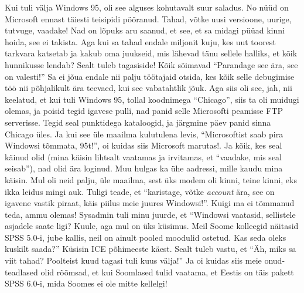 Kui tuli välja Windows 95, oli see alguses kohutavalt suur saladus. No nüüd on 
Microsoft ennast täiesti teisipidi pööranud. Tahad, võtke uusi versioone, 
uurige, tutvuge, vaadake! Nad on lõpuks aru saanud, et see, et sa midagi püüad 
kinni hoida, see ei takista. Aga kui sa tahad endale miljonit kuju, kes uut 
toorest tarkvara katsetab ja kakub oma juukseid, mis lähevad tänu sellele 
halliks, et kõik hunnikusse lendab? Sealt tuleb tagasiside! Kõik sõimavad 
\enquote{Parandage see ära, see on valesti!} Sa ei jõua endale nii palju 
töötajaid otsida, kes  kõik selle debugimise töö nii põhjalikult ära teevaed, 
kui see vabatahtlik jõuk. Aga siis oli see, jah, nii keelatud, et kui tuli 
Windows 95, tollal koodnimega \enquote{Chicago}, siis ta oli muidugi olemas, ja 
poisid tegid igavese pulli, nad panid selle Microsofti peamisse FTP serverisse. 
Tegid seal punktidega kataloogid, ja järgmine päev panid sinna Chicago üles. Ja 
kui see üle  maailma kulutulena levis, \enquote{Microsoftist saab pira Windowsi 
tõmmata, 95t!}, oi kuidas siis Microsoft marutas!. Ja kõik, kes seal käinud 
olid (mina käisin lihtsalt vaatamas ja irvitamas,  et \enquote{vaadake, mis 
seal seisab}), nad olid ära loginud. Muu hulgas ka ühe  aadressi, mille kaudu 
mina käisin. Mul oli neid palju, üle maailma, sest üks modem oli kinni, teine 
kinni, eks ikka leidus mingi auk. Tuligi teade, et \enquote{karistage, võtke 
\emph{account} ära, see on igavene vastik piraat, käis piilus meie juures 
Windowsi!}. Kuigi ma ei tõmmanud teda, ammu olemas! Sysadmin tuli minu juurde, 
et \enquote{Windowsi vaatasid, sellistele asjadele saate ligi? Kuule, aga mul 
on üks küsimus. Meil Soome kolleegid näitasid SPSS  5.0-i, jube kallis, neil 
on ainult pooled moodulid ostetud. Kas seda oleks kuskilt saada?} Küsisin ICE 
põhimeeste käest. Sealt tuleb vastu, et \enquote{Äh, miks sa viit tahad? 
Poolteist kuud tagasi tuli kuus välja!} Ja oi kuidas siis meie onud-teadlased 
olid rõõmsad, et kui Soomlased tulid vaatama, et Eestis on täis pakett SPSS 
6.0-i, mida Soomes ei ole mitte kellelgi! 

